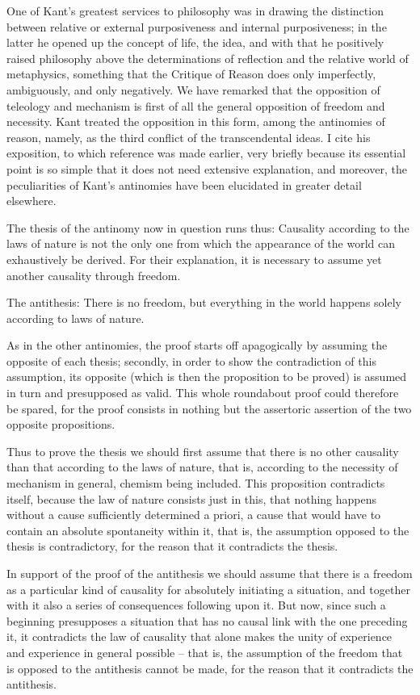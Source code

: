 One of Kant's greatest services to philosophy was
in drawing the distinction between relative or
external purposiveness and internal purposiveness;
in the latter he opened up the concept of life, the idea,
and with that he positively raised philosophy
above the determinations of reflection
and the relative world of metaphysics,
something that the Critique of Reason does
only imperfectly, ambiguously, and only negatively.
We have remarked that the opposition of teleology and mechanism is
first of all the general opposition of freedom and necessity.
Kant treated the opposition in this form, among the antinomies of reason,
namely, as the third conflict of the transcendental ideas.
I cite his exposition, to which reference was made earlier,
very briefly because its essential point is so simple
that it does not need extensive explanation,
and moreover, the peculiarities of Kant's antinomies
have been elucidated in greater detail elsewhere.

The thesis of the antinomy now in question runs thus:
Causality according to the laws of nature is
not the only one from which the appearance of
the world can exhaustively be derived.
For their explanation, it is necessary to
assume yet another causality through freedom.

The antithesis: There is no freedom,
but everything in the world happens
solely according to laws of nature.

As in the other antinomies, the proof starts off apagogically
by assuming the opposite of each thesis;
secondly, in order to show the contradiction of this assumption,
its opposite (which is then the proposition to be proved)
is assumed in turn and presupposed as valid.
This whole roundabout proof could therefore be spared,
for the proof consists in nothing but the assertoric
assertion of the two opposite propositions.

Thus to prove the thesis we should first assume that there is no other
causality than that according to the laws of nature, that is, according to
the necessity of mechanism in general, chemism being included. This
proposition contradicts itself, because the law of nature consists just in
this, that nothing happens without a cause sufficiently determined a priori, a
cause that would have to contain an absolute spontaneity within it, that is,
the assumption opposed to the thesis is contradictory, for the reason that
it contradicts the thesis.

In support of the proof of the antithesis we should assume that there is a
freedom as a particular kind of causality for absolutely initiating a situation,
and together with it also a series of consequences following upon it. But
now, since such a beginning presupposes a situation that has no causal link
with the one preceding it, it contradicts the law of causality that alone
makes the unity of experience and experience in general possible – that is,
the assumption of the freedom that is opposed to the antithesis cannot be
made, for the reason that it contradicts the antithesis.

